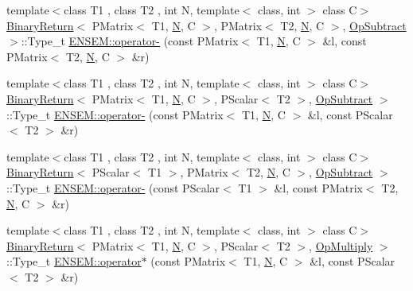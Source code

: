 \begin{DoxyCompactItemize}
{\footnotesize template$<$class T1 , class T2 , int N, template$<$ class, int $>$ class C$>$ }\\\mbox{\hyperlink{structBinaryReturn}{Binary\+Return}}$<$ P\+Matrix$<$ T1, \mbox{\hyperlink{adat__devel_2lib_2hadron_2operator__name__util_8cc_a7722c8ecbb62d99aee7ce68b1752f337}{N}}, C $>$, P\+Matrix$<$ T2, \mbox{\hyperlink{adat__devel_2lib_2hadron_2operator__name__util_8cc_a7722c8ecbb62d99aee7ce68b1752f337}{N}}, C $>$, \mbox{\hyperlink{structOpSubtract}{Op\+Subtract}} $>$\+::Type\+\_\+t \mbox{\hyperlink{group__primmatrix_ga2f9d8cfed40f93d8bfffe86a9255ed52}{E\+N\+S\+E\+M\+::operator-\/}} (const P\+Matrix$<$ T1, \mbox{\hyperlink{adat__devel_2lib_2hadron_2operator__name__util_8cc_a7722c8ecbb62d99aee7ce68b1752f337}{N}}, C $>$ \&l, const P\+Matrix$<$ T2, \mbox{\hyperlink{adat__devel_2lib_2hadron_2operator__name__util_8cc_a7722c8ecbb62d99aee7ce68b1752f337}{N}}, C $>$ \&r)
\item 
{\footnotesize template$<$class T1 , class T2 , int N, template$<$ class, int $>$ class C$>$ }\\\mbox{\hyperlink{structBinaryReturn}{Binary\+Return}}$<$ P\+Matrix$<$ T1, \mbox{\hyperlink{adat__devel_2lib_2hadron_2operator__name__util_8cc_a7722c8ecbb62d99aee7ce68b1752f337}{N}}, C $>$, P\+Scalar$<$ T2 $>$, \mbox{\hyperlink{structOpSubtract}{Op\+Subtract}} $>$\+::Type\+\_\+t \mbox{\hyperlink{group__primmatrix_gaa44a21f7776bb8fe8502a30e74d88e3f}{E\+N\+S\+E\+M\+::operator-\/}} (const P\+Matrix$<$ T1, \mbox{\hyperlink{adat__devel_2lib_2hadron_2operator__name__util_8cc_a7722c8ecbb62d99aee7ce68b1752f337}{N}}, C $>$ \&l, const P\+Scalar$<$ T2 $>$ \&r)
\item 
{\footnotesize template$<$class T1 , class T2 , int N, template$<$ class, int $>$ class C$>$ }\\\mbox{\hyperlink{structBinaryReturn}{Binary\+Return}}$<$ P\+Scalar$<$ T1 $>$, P\+Matrix$<$ T2, \mbox{\hyperlink{adat__devel_2lib_2hadron_2operator__name__util_8cc_a7722c8ecbb62d99aee7ce68b1752f337}{N}}, C $>$, \mbox{\hyperlink{structOpSubtract}{Op\+Subtract}} $>$\+::Type\+\_\+t \mbox{\hyperlink{group__primmatrix_ga6f60741d61098ca196a5f733f86a5835}{E\+N\+S\+E\+M\+::operator-\/}} (const P\+Scalar$<$ T1 $>$ \&l, const P\+Matrix$<$ T2, \mbox{\hyperlink{adat__devel_2lib_2hadron_2operator__name__util_8cc_a7722c8ecbb62d99aee7ce68b1752f337}{N}}, C $>$ \&r)
\item 
{\footnotesize template$<$class T1 , class T2 , int N, template$<$ class, int $>$ class C$>$ }\\\mbox{\hyperlink{structBinaryReturn}{Binary\+Return}}$<$ P\+Matrix$<$ T1, \mbox{\hyperlink{adat__devel_2lib_2hadron_2operator__name__util_8cc_a7722c8ecbb62d99aee7ce68b1752f337}{N}}, C $>$, P\+Scalar$<$ T2 $>$, \mbox{\hyperlink{structOpMultiply}{Op\+Multiply}} $>$\+::Type\+\_\+t \mbox{\hyperlink{group__primmatrix_ga9edd8305793268c1fbc1b874baa000d3}{E\+N\+S\+E\+M\+::operator$\ast$}} (const P\+Matrix$<$ T1, \mbox{\hyperlink{adat__devel_2lib_2hadron_2operator__name__util_8cc_a7722c8ecbb62d99aee7ce68b1752f337}{N}}, C $>$ \&l, const P\+Scalar$<$ T2 $>$ \&r)

\end{DoxyCompactItemize}
